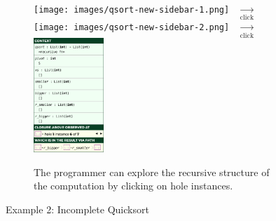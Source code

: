 \begin{figure}[t]
\begin{subfigure}[t]{\textwidth}
\centering
\texttt{[image: images/qsort-new-sidebar-1.png]}
~$\xrightarrow[\text{click}]{}$
\texttt{[image: images/qsort-new-sidebar-2.png]}
~$\xrightarrow[\text{click}]{}$
\includegraphics[width=0.29\textwidth,interpolate=false,valign=c]{images/qsort-new-sidebar-3.png}
\caption{The programmer can explore the recursive structure of the computation by clicking on hole instances.}
\label{fig:qsort-sidebars}
\end{subfigure}

\vspace{3px}

\caption{Example 2: Incomplete Quicksort}
\label{fig:qsort-cell-mockup}

\vspace{-8px}
\end{figure}



